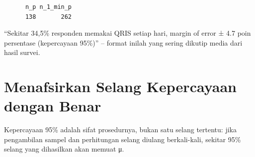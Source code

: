 \documentclass[
  indonesian,
  letterpaper,
]{book}
\begin{document}
\begin{verbatim}
      n_p n_1_min_p 
      138       262 
\end{verbatim}

``Sekitar 34,5\% responden memakai QRIS setiap hari, margin of error ±
4.7 poin persentase (kepercayaan 95\%)'' -- format inilah yang sering
dikutip media dari hasil survei.

\section{Menafsirkan Selang Kepercayaan dengan
Benar}\label{menafsirkan-selang-kepercayaan-dengan-benar}

Kepercayaan 95\% adalah sifat prosedurnya, bukan satu selang tertentu:
jika pengambilan sampel dan perhitungan selang diulang berkali-kali,
sekitar 95\% selang yang dihasilkan akan memuat μ.
\end{document}
